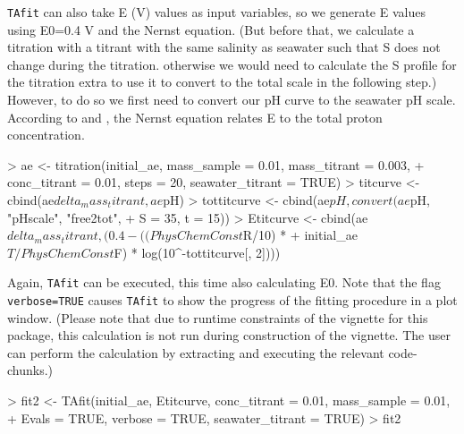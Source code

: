 \documentclass[article,nojss]{jss}
\begin{document}
\noindent
\texttt{TAfit} can also take E (V) values as input variables, so we generate E values using E0=0.4 V and the Nernst equation.
(But before that, we calculate a titration with a titrant with the same salinity as seawater such that S does not change during the titration.
otherwise we would need to calculate the S profile for the titration extra to use it to convert to the total scale in the following step.)
However, to do so we first need to convert our pH curve to the seawater pH scale. According to \cite[p.7, ch.4, sop.3]{DOE1994} and \cite{Dickson2007}, the Nernst equation relates E to 
the total proton concentration.
\begin{Schunk}
\begin{Sinput}
> ae <- titration(initial_ae, mass_sample = 0.01, mass_titrant = 0.003, 
+     conc_titrant = 0.01, steps = 20, seawater_titrant = TRUE)
> titcurve <- cbind(ae$delta_mass_titrant, ae$pH)
> tottitcurve <- cbind(ae$pH, convert(ae$pH, "pHscale", "free2tot", 
+     S = 35, t = 15))
> Etitcurve <- cbind(ae$delta_mass_titrant, (0.4 - ((PhysChemConst$R/10) * 
+     initial_ae$T/PhysChemConst$F) * log(10^-tottitcurve[, 2])))
\end{Sinput}
\end{Schunk}
Again, \texttt{TAfit} can be executed, this time also calculating E0. Note that the flag \texttt{verbose=TRUE} causes
\texttt{TAfit} to show the progress of the fitting procedure in a plot window.
(Please note that due to runtime constraints of the vignette for this package, this calculation is not run during construction of the vignette. 
 The user can perform the calculation by extracting and executing the relevant code-chunks.)
\begin{Schunk}
\begin{Sinput}
> fit2 <- TAfit(initial_ae, Etitcurve, conc_titrant = 0.01, mass_sample = 0.01, 
+     Evals = TRUE, verbose = TRUE, seawater_titrant = TRUE)
> fit2
\end{Sinput}
\end{Schunk}
\end{document}
